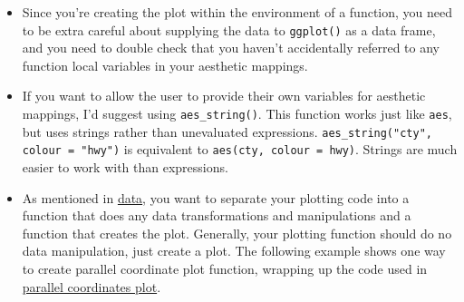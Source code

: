 \begin{itemize}
\itemsep1pt\parskip0pt
\item
  Since you're creating the plot within the environment of a function,
  you need to be extra careful about supplying the data to
  \texttt{ggplot()} as a data frame, and you need to double check that
  you haven't accidentally referred to any function local variables in
  your aesthetic mappings.
\item
  If you want to allow the user to provide their own variables for
  aesthetic mappings, I'd suggest using \texttt{aes\_string()}. This
  function works just like \texttt{aes}, but uses strings rather than
  unevaluated expressions. \texttt{aes\_string("cty", colour = "hwy")}
  is equivalent to \texttt{aes(cty, colour = hwy)}. Strings are much
  easier to work with than expressions.
   
\item
  As mentioned in \hyperref[cha:data]{data}, you want to separate your
  plotting code into a function that does any data transformations and
  manipulations and a function that creates the plot. Generally, your
  plotting function should do no data manipulation, just create a plot.
  The following example shows one way to create parallel coordinate plot
  function, wrapping up the code used in
  \hyperref[sub:molten-data]{parallel coordinates plot}.
\end{itemize}

